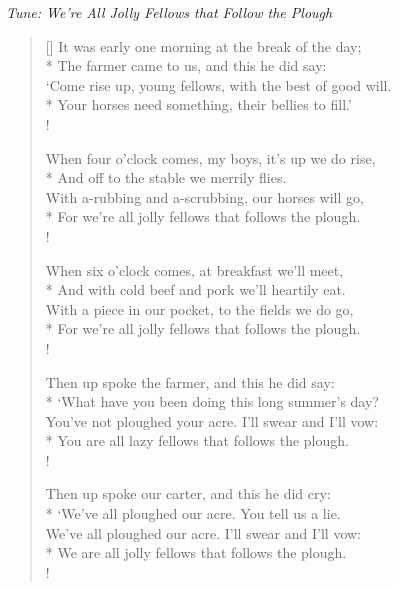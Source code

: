 \documentclass[MAIN]{subfiles}
\begin{document}
\bigskip

\begin{center}
{\it Tune: We're All Jolly Fellows that Follow the Plough}
\end{center}

\bigskip

\settowidth{\versewidth}{`Come rise up, young fellows, with the best of good will.}
\begin{verse}[\versewidth]
It was early one morning at the break of the day;\\*
The farmer came to us, and this he did say:\\
`Come rise up, young fellows, with the best of good will.\\*
Your horses need something, their bellies to fill.'\\!

When four o'clock comes, my boys, it's up we do rise,\\*
And off to the stable we merrily flies.\\
With a-rubbing and a-scrubbing, our horses will go,\\*
For we're all jolly fellows that follows the plough.\\!

When six o'clock comes, at breakfast we'll meet,\\*
And with cold beef and pork we'll heartily eat.\\
With a piece in our pocket, to the fields we do go,\\*
For we're all jolly fellows that follows the plough.\\!

Then up spoke the farmer, and this he did say:\\*
`What have you been doing this long summer's day?\\
You've not ploughed your acre. I'll swear and I'll vow:\\*
You are all lazy fellows that follows the plough.\\!

Then up spoke our carter, and this he did cry:\\*
`We've all ploughed our acre. You tell us a lie.\\
We've all ploughed our acre. I'll swear and I'll vow:\\*
We are all jolly fellows that follows the plough.\\!


\end{verse}
\end{document}
